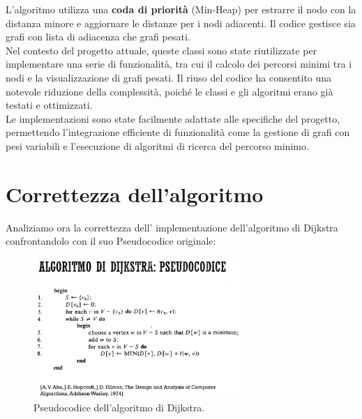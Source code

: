 \documentclass[a4paper,12pt]{article}
\begin{document}
L'algoritmo utilizza una \textbf{coda di priorità} (Min-Heap) per estrarre il nodo con 
la distanza minore e aggiornare le distanze per i nodi adiacenti. Il codice gestisce sia grafi 
con lista di adiacenza che grafi pesati.\\

Nel contesto del progetto attuale, queste classi sono state riutilizzate per 
implementare una serie di funzionalità, tra cui il calcolo dei percorsi minimi tra 
i nodi e la visualizzazione di grafi pesati. Il riuso del codice ha consentito una 
notevole riduzione della complessità, poiché le classi e gli algoritmi erano già 
testati e ottimizzati.\\

Le implementazioni sono state facilmente adattate alle specifiche del progetto, 
permettendo l'integrazione efficiente di funzionalità come la gestione di grafi con 
pesi variabili e l'esecuzione di algoritmi di ricerca del percorso minimo.


\section{Correttezza dell'algoritmo}

Analiziamo ora la correttezza dell' implementazione dell'algoritmo di Dijkstra 
confrontandolo con il suo Pseudocodice originale: 

\begin{figure}[h!]
    \centering
    \includegraphics[width=0.7\textwidth]{Images/DijkstraPseudoCode.png}
    \caption{Pseudocodice dell'algoritmo di Dijkstra.}
    \label{fig:Pseudocodice Dijkstra}
\end{figure}
\end{document}
